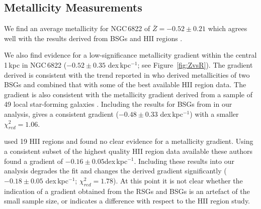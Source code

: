 \documentclass[iop]{emulateapj}
\begin{document}
\subsection{Metallicity Measurements} %
\label{sub:metallicity_measurements}

We find an average metallicity for NGC\,6822 of $\bar{Z}=-0.52\pm 0.21$
which agrees well with the results derived from BSGs
\citep{1999A&A...352L..40M,2001ApJ...547..765V,Przybilla02} and HII regions
\citep{2006ApJ...642..813L}.

We also find evidence for a low-significance metallicity gradient within the central 1\,kpc in NGC\,6822
($-0.52\pm0.35$ dex\,kpc$^{-1}$; see Figure~\ref{fig:ZvsR}).
The gradient derived is consistent with the trend reported in
\cite{2001ApJ...547..765V} who derived metallicities of two BSGs and combined that with some of the best available HII region data.
The gradient is also consistent with the metallicity gradient derived from a sample of 49 local star-forming galaxies
.
Including the results for BSGs from
\cite{2001ApJ...547..765V} 
in our analysis,
gives a consistent gradient
($-0.48\pm 0.33$ dex\,kpc$^{-1}$)
with a smaller 
$\chi^{2}_{red}=1.06$.


\cite{2006ApJ...642..813L} used 19 HII
regions and found no clear evidence for a metallicity gradient.
Using a consistent subset of the highest quality HII
region data available these authors found a gradient of
$-0.16\pm0.05$dex\,kpc$^{-1}$.
Including these results into our analysis degrades the fit and changes the derived gradient significantly
($-0.18\pm0.05$ dex\,kpc$^{-1}$; $\chi^{2}_{red}=1.78$).
At this point it is not clear whether the indication of a gradient obtained from the RSGs and BSGs is an artefact of the small sample size, 
or indicates a difference with respect to the HII region study.
\end{document}
